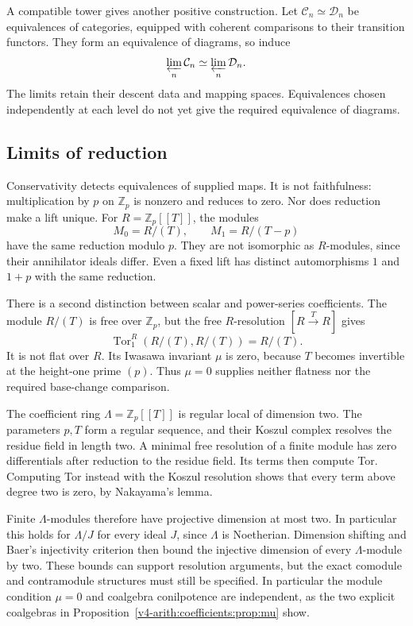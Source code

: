 A compatible tower gives another positive construction.
Let $\mathcal C_n\simeq\mathcal D_n$ be equivalences of
categories, equipped with coherent comparisons to their
transition functors. They form an equivalence of diagrams,
so induce
\[
 \varprojlim_n\mathcal C_n\simeq\varprojlim_n\mathcal D_n.
\]
The limits retain their descent data and mapping spaces.
Equivalences chosen independently at each level do not yet
give the required equivalence of diagrams.

\subsection{Limits of reduction}

Conservativity detects equivalences of supplied maps. It is
not faithfulness: multiplication by $p$ on $\mathbb Z_p$ is
nonzero and reduces to zero. Nor does reduction make a lift
unique. For $R=\mathbb Z_p[[T]]$, the modules
\[
 M_0=R/(T),\qquad M_1=R/(T-p)
\]
have the same reduction modulo $p$. They are not isomorphic
as $R$-modules, since their annihilator ideals differ.
Even a fixed lift has distinct automorphisms $1$ and $1+p$
with the same reduction.

There is a second distinction between scalar and power-series
coefficients. The module $R/(T)$ is free over $\mathbb Z_p$,
but the free $R$-resolution
$[R\xrightarrow{T}R]$ gives
\[
 \operatorname{Tor}_1^R(R/(T),R/(T))=R/(T).
\]
It is not flat over $R$. Its Iwasawa invariant $\mu$ is zero,
because $T$ becomes invertible at the height-one prime $(p)$.
Thus $\mu=0$ supplies neither flatness nor the required
base-change comparison.

The coefficient ring $\Lambda=\mathbb Z_p[[T]]$ is regular
local of dimension two. The parameters $p,T$ form a regular
sequence, and their Koszul complex resolves the residue field
in length two. A minimal free resolution of a finite module has
zero differentials after reduction to the residue field. Its
terms then compute Tor. Computing Tor instead with the Koszul
resolution shows that every term above degree two is zero,
by Nakayama's lemma.

Finite $\Lambda$-modules therefore have
projective dimension at most two. In particular this holds
for $\Lambda/J$ for every ideal $J$, since $\Lambda$ is
Noetherian. Dimension shifting and Baer's injectivity criterion
then bound the injective dimension of every $\Lambda$-module
by two.
These bounds can support resolution arguments, but the exact comodule
and contramodule structures must still be specified.
In particular the module condition $\mu=0$ and coalgebra
conilpotence are independent, as the two explicit coalgebras
in Proposition~\ref{v4-arith:coefficients:prop:mu} show.

